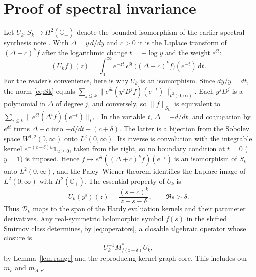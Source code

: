 \documentclass[12pt,letterpaper]{article}
\theoremstyle{remark}
\numberwithin{equation}{section}
\newcommand{\C}{\mathbb C}
\newcommand{\dd}{\,\mathrm d}
\begin{document}
\section{Proof of spectral invariance}\label{sec:proof}
Let $U_k:S_k\to H^2(\C_+)$ denote the bounded isomorphism of the earlier spectral-synthesis note \cite{JoynerNote}. With $\Delta=y\,d/dy$ and $c>0$ it is the Laplace transform of $(\Delta+c)^kf$ after the logarithmic change $t=-\log y$ and the weight $e^{\delta t}$:
\[
 (U_kf)(z)=\int_0^\infty e^{-zt}\,e^{\delta t}\,\big((\Delta+c)^kf\big)(e^{-t})\dd t .
\]
For the reader's convenience, here is why $U_k$ is an isomorphism.
Since $dy/y=dt$, the norm \eqref{eq:Sk} equals
$\sum_{j\le k}\|e^{\delta t}(y^jD^jf)(e^{-t})\|_{L^2(0,\infty)}^2$.
Each $y^jD^j$ is a polynomial in $\Delta$ of degree $j$, and conversely,
so $\|f\|_{S_k}$ is equivalent to
$\sum_{i\le k}\|e^{\delta t}(\Delta^if)(e^{-t})\|_{L^2}$.
In the variable $t$, $\Delta=-d/dt$, and conjugation by $e^{\delta t}$
turns $\Delta+c$ into $-d/dt+(c+\delta)$.  The latter is a bijection from
the Sobolev space $W^{1,2}(0,\infty)$ onto $L^2(0,\infty)$.  Its inverse is
convolution with the integrable kernel $e^{-(c+\delta)u}\mathbf 1_{u\ge0}$,
taken from the right, so no boundary condition at $t=0$ ($y=1$) is
imposed.  Hence $f\mapsto e^{\delta t}((\Delta+c)^kf)(e^{-t})$ is an
isomorphism of $S_k$ onto $L^2(0,\infty)$, and the Paley--Wiener theorem
identifies the Laplace image of $L^2(0,\infty)$ with $H^2(\C_+)$.
The essential property of $U_k$ is
\begin{equation}\label{eq:Uk}
 U_k(y^s)(z)=\frac{(s+c)^k}{z+s-\delta},\qquad \Re s>\delta.
\end{equation}
Thus $\mathcal D_k$ maps to the span of the Hardy evaluation kernels and their parameter derivatives. Any real-symmetric holomorphic symbol $f(s)$ in the shifted Smirnov class determines, by \eqref{eq:operators}, a closable algebraic operator whose closure is
\begin{equation}\label{eq:adjointmodel}
 U_k^{-1}M_{f(z+\delta)}^*U_k,
\end{equation}
by Lemma~\ref{lem:range} and the reproducing-kernel graph core. This includes our $m_r$ and $m_{A,r}$.
\end{document}
